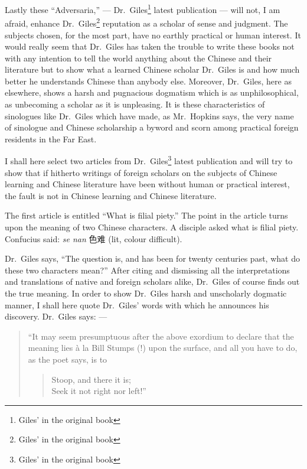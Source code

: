 Lastly these ``Adversaria,'' --- Dr.~Giles\footnote{Giles' in the original book}  latest publication --- will not, I am afraid, enhance Dr.~Giles\footnote{Giles' in the original book}  reputation as a scholar of sense and judgment.
The subjects chosen, for the most part, have no earthly practical or human interest.
It would really seem that Dr.~Giles has taken the trouble to write these books not with any intention to tell the world anything about the Chinese and their literature but to show what a learned Chinese scholar Dr.~Giles is and how much better he understands Chinese than anybody else.
Moreover, Dr.~Giles, here as elsewhere, shows a harsh and pugnacious dogmatism which is as unphilosophical, as unbecoming a scholar as it is unpleasing.
It is these characteristics of sinologues like Dr.~Giles which have made, as Mr.~Hopkins says, the very name of sinologue and Chinese scholarship a byword and scorn among practical foreign residents in the Far East.

I shall here select two articles from Dr.~Giles\footnote{Giles' in the original book}  latest publication and will try to show that if hitherto writings of foreign scholars on the subjects of Chinese learning and Chinese literature have been without human or practical interest, the fault is not in Chinese learning and Chinese literature.

The first article is entitled ``What is filial piety.'' 
The point in the article turns upon the meaning of two Chinese characters.
A disciple asked what is filial piety.
Confucius said: \emph{se nan} 色难 (lit, colour difficult).

Dr.~Giles says, ``The question is, and has been for twenty centuries past, what do these two characters mean?''
After citing and dismissing all the interpretations and translations of native and foreign scholars alike, Dr.~Giles of course finds out the true meaning.
In order to show Dr.~Giles  harsh and unscholarly dogmatic manner, I shall here quote Dr.~Giles' words with which he announces his discovery. Dr.~Giles says: ---
\begin{quote}\footnotesize
    ``It may seem presumptuous after the above exordium to declare that the meaning lies \`a la  Bill Stumps (!) upon the surface, and all you have to do, as the poet says, is to
\begin{quote}\footnotesize
    Stoop, and there it is; \\
    Seek it not right nor left!''
\end{quote}
\end{quote}

